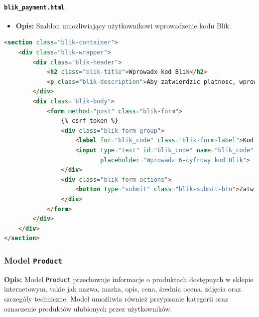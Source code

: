 \documentclass[12pt,a4paper,oneside]{article}
\theoremstyle{definition}
\numberwithin{equation}{section}
\begin{document}
\paragraph{\texttt{blik\_payment.html}}
\begin{itemize}
    \item \textbf{Opis:} Szablon umożliwiający użytkownikowi wprowadzenie kodu Blik.
\end{itemize}

\begin{lstlisting}[language=HTML, caption=Szablon blik_payment.html]
<section class="blik-container">
    <div class="blik-wrapper">
        <div class="blik-header">
            <h2 class="blik-title">Wprowadx kod Blik</h2>
            <p class="blik-description">Aby zatwierdzic platnosc, wprowadz 6-cyfrowy kod wygenerowany w aplikacji mobilnej banku.</p>
        </div>
        <div class="blik-body">
            <form method="post" class="blik-form">
                {% csrf_token %}
                <div class="blik-form-group">
                    <label for="blik_code" class="blik-form-label">Kod Blik</label>
                    <input type="text" id="blik_code" name="blik_code" maxlength="6" class="blik-form-input"
                           placeholder="Wprowadz 6-cyfrowy kod Blik">
                </div>
                <div class="blik-form-actions">
                    <button type="submit" class="blik-submit-btn">Zatwierdz kod</button>
                </div>
            </form>
        </div>
    </div>
</section>
\end{lstlisting}

% 
% 
% 
% 
\subsubsection{Model \texttt{Product}}

\textbf{Opis:}  
Model \texttt{Product} przechowuje informacje o produktach dostępnych w sklepie internetowym, takie jak nazwa, marka, opis, cena, średnia ocena, zdjęcia oraz szczegóły techniczne. Model umożliwia również przypisanie kategorii oraz oznaczenie produktów ulubionych przez użytkowników.
\end{document}
